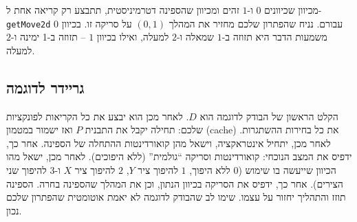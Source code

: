 \documentclass[12pt]{article}
\begin{document}
מכיוון שכיוונים $0$ ו-$1$ זהים ומכיוון שהספינה דטרמיניסטית, תתבצע רק קריאה אחת ל-\foreignlanguage{english}{\texttt{getMove2d}} עבורם. נניח שהפתרון שלכם מחזיר את המהלך $(0, 1)$ על סריקה זו. בכיוון $0$ משמעות הדבר היא תזוזה ב-$1$ שמאלה ו-$2$ למעלה, ואילו בכיוון $1$ -- תזוזה ב-1 ימינה ו-$2$ למעלה.

\subsection{גריידר לדוגמה}

הקלט הראשון של הבודק לדוגמה הוא $D$. לאחר מכן הוא יבצע את כל הקריאות לפונקציות שלכם: תחילה יקבל את התבנית $P$ ואז ישמור במטמון (cache) את כל בחירות ההשתגרות. לאחר מכן, יתחיל אינטראקציה, וישאל מהן קואורדינטות ההתחלה של הספינה. אחר כך, ידפיס את המצב הנוכחי: קואורדינטות וסריקה ``גולמית'' (ללא היפוכים). לאחר מכן, ישאל מהו הכיוון שייעשה בו שימוש ($0$ ללא היפוך, $1$ להיפוך ציר $Y$, $2$ להיפוך ציר $X$ ו-$3$ להיפוך שני הצירים). אחר כך, ידפיס את הסריקה בכיוון הנתון, וכן את המהלך שהספינה בחרה. הספינה תוזז והתהליך יחזור על עצמו. שימו לב שהבודק לדוגמה לא יאמת אוטומטית שהפתרון שלכם נכון.
\end{document}
